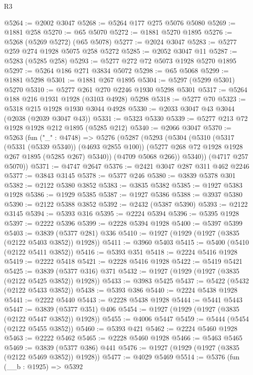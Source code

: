 \begin{lexlean}{R3}
\begin{coremodule}
@5264 := @2002 @3047
@5268 := @5264 @177 @275 @5076 @5080
@5269 := @1881 @258
@5270 := @65 @5070
@5272 := @1881 @5270 @1895
@5276 := @5268 (@5269 @5272) (@65 @5078)
@5277 := @2024 @3047
@5283 := @5277 @259 @274 @1928 @5075 @258 @5272
@5285 := @2052 @3047 @11
@5287 := @5283 (@5285 @258)
@5293 := @5277 @272 @72 @5073 @1928 @5270 @1895
@5297 := @5264 @186 @271 @3834 @5072
@5298 := @65 @5068
@5299 := @1881 @5298
@5301 := @1881 @267 @1895
@5304 := @5297 (@5299 @5301) @5270
@5310 := @5277 @261 @270 @2246 @1930 @5298 @5301
@5317 := @5264 @188 @216 @1931 @1928 (@3103 @4928) @5298
@5318 := @5277 @70
@5323 := @5318 @215 @1928 @1930 @3044 @4928
@5330 := @2033 @3047 @43 @3044 (@2038 (@2039 @3047 @43))
@5331 := @5323 @5330
@5339 := @5277 @213 @72 @1928 @1928 @212 @1895 (@5285 @212)
@5340 := @2066 @3047
@5370 := @5263
    (fun ("_" : @4748) =>
    @5276
      (@5287
        (@5293
          (@5304
            (@5310
              (@5317 (@5331 (@5339 @5340)) (@4693 @2855 @100))
              (@5277 @268 @72 @1928 @1928 @267 @1895 (@5285 @267) @5340))
            (@4709 @5068 @266))
          @5340))
      (@4717 @257 @5070))
@5371 := @4747 @2647
@5376 := @2421 @3047 @287 @311 @462 @2246
@5377 := @3843 @3145
@5378 := @5377 @246
@5380 := @3839 @5378 @301
@5382 := @2122 @5380 @3852
@5383 := @3835 @5382
@5385 := @1927 @5383 @1928
@5386 := @1929 @5385
@5387 := @1927 @5386
@5388 := @3937 @5380
@5390 := @2122 @5388 @3852
@5392 := @2432 (@5387 @5390)
@5393 := @2122 @3145
@5394 := @5393 @316
@5395 := @2224 @5394
@5396 := @5395 @1928
@5397 := @2222 @5396
@5399 := @2228 @5394 @1928
@5400 := @5397 @5399
@5403 := @3839 (@5377 @281) @336
@5410 := @1927 (@1929 (@1927 (@3835 (@2122 @5403 @3852)) @1928))
@5411 := @3960 @5403
@5415 := @5400 (@5410 (@2122 @5411 @3852))
@5416 := @5393 @351
@5418 := @2224 @5416 @1928
@5419 := @2222 @5418
@5421 := @2228 @5416 @1928
@5422 := @5419 @5421
@5425 := @3839 (@5377 @316) @371
@5432 := @1927 (@1929 (@1927 (@3835 (@2122 @5425 @3852)) @1928))
@5433 := @3983 @5425
@5437 := @5422 (@5432 (@2122 @5433 @3852))
@5438 := @5393 @386
@5440 := @2224 @5438 @1928
@5441 := @2222 @5440
@5443 := @2228 @5438 @1928
@5444 := @5441 @5443
@5447 := @3839 (@5377 @351) @406
@5454 := @1927 (@1929 (@1927 (@3835 (@2122 @5447 @3852)) @1928))
@5455 := @4006 @5447
@5459 := @5444 (@5454 (@2122 @5455 @3852))
@5460 := @5393 @421
@5462 := @2224 @5460 @1928
@5463 := @2222 @5462
@5465 := @2228 @5460 @1928
@5466 := @5463 @5465
@5469 := @3839 (@5377 @386) @441
@5476 := @1927 (@1929 (@1927 (@3835 (@2122 @5469 @3852)) @1928))
@5477 := @4029 @5469
@5514 := @5376
    (fun (__b : @1925) =>
    @5392

\end{coremodule}
\end{lexlean}
